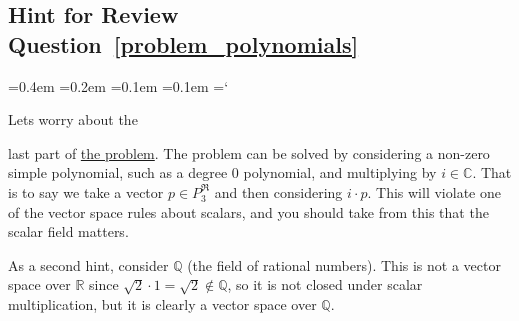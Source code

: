 
\subsection*{Hint for Review Question~\ref{problem_polynomials}}

{\ttfamily
{}\font=0.4em
\font=0.2em
\font=0.1em
\font=0.1em
\hyphenchar\font=`\-

\hypertarget{scripts_vector_spaces_hint}{Lets worry about the} last part of \hyperref[problem_polynomials]{the problem}. The problem can be solved by considering a non-zero simple polynomial, such as a degree 0 polynomial, and multiplying by $i \in \mathbb{C}$. That is to say we take a vector $p \in P_3^{\Re}$ and then considering $i \cdot p$. This will violate one of the vector space rules about scalars, and you should take from this that the scalar field matters.

As a second hint, consider $\mathbb{Q}$ (the field of rational numbers). This is not a vector space over $\mathbb{R}$ since $\sqrt{2} \cdot 1 = \sqrt{2} \notin \mathbb{Q}$, so it is not closed under scalar multiplication, but it is clearly a vector space over $\mathbb{Q}$.

} %

